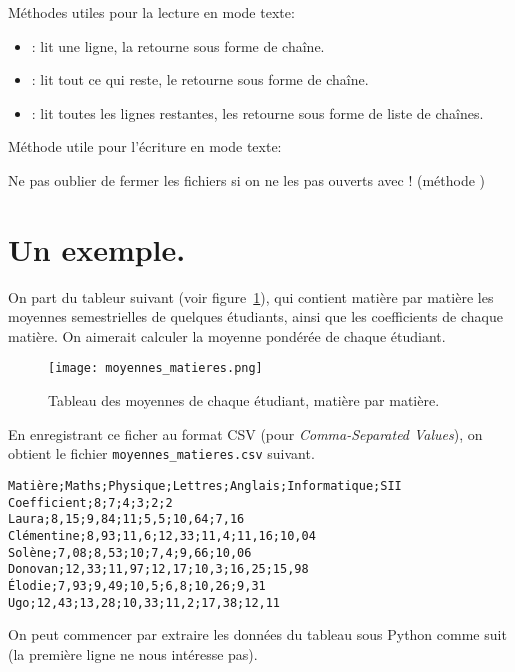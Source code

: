 Méthodes utiles pour la lecture en mode texte:
\begin{itemize}
\item {}: lit une ligne, la retourne sous forme de chaîne.
\item {}: lit tout ce qui reste, le retourne sous forme de chaîne.
\item {}: lit toutes les lignes restantes, les retourne
  sous forme de liste de chaînes.
\end{itemize}

Méthode utile pour l'écriture en mode texte: 

Ne pas oublier de fermer les fichiers si on ne les pas ouverts avec
! (méthode )

\section{Un exemple.}

On part du tableur suivant (voir figure~\ref{07:tab:moyennes_matieres}), qui contient matière par matière les moyennes semestrielles de quelques étudiants, ainsi que les coefficients de chaque matière. On aimerait calculer la moyenne pondérée de chaque étudiant. 

\begin{figure}[h!]
    \begin{center}
        \texttt{[image: moyennes\_matieres.png]}
    \end{center}
    \caption{Tableau des moyennes de chaque étudiant, matière par matière.}
    \label{07:tab:moyennes_matieres}
\end{figure}


En enregistrant ce ficher au format CSV (pour \emph{Comma-Separated Values}), on obtient le fichier \texttt{moyennes\_matieres.csv} suivant. 
\begin{lstlisting}
Matière;Maths;Physique;Lettres;Anglais;Informatique;SII
Coefficient;8;7;4;3;2;2
Laura;8,15;9,84;11;5,5;10,64;7,16
Clémentine;8,93;11,6;12,33;11,4;11,16;10,04
Solène;7,08;8,53;10;7,4;9,66;10,06
Donovan;12,33;11,97;12,17;10,3;16,25;15,98
Élodie;7,93;9,49;10,5;6,8;10,26;9,31
Ugo;12,43;13,28;10,33;11,2;17,38;12,11
\end{lstlisting}


On peut commencer par extraire les données du tableau sous Python{} comme suit (la première ligne ne nous intéresse pas).

